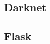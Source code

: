         \subsection{Darknet} \label{cap:fund-frameworks-darknet}

        \subsection{Flask} \label{cap:fund-frameworks-flask}

\begin{comment}


\end{comment}
